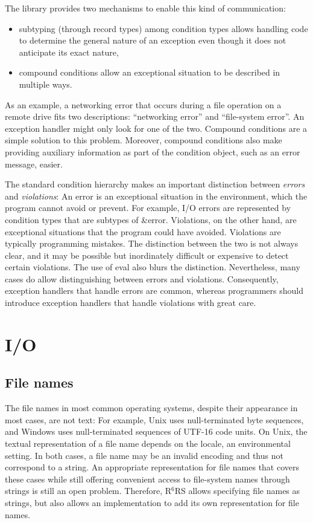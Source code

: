 \documentclass[twoside,twocolumn]{algol60}
\newcommand{\rn}[1]{R$^{#1}$RS}
\begin{document}
The  library provides two mechanisms to
enable this kind of communication:
%
\begin{itemize}
\item subtyping (through record types) among condition types allows
  handling code to determine the general nature of an exception even
  though it does not anticipate its exact nature,
\item compound conditions allow an exceptional situation to be
  described in multiple ways.
\end{itemize}
%
As an example, a networking error that occurs during a file operation
on a remote drive fits two descriptions: ``networking error'' and
``file-system error''.  An exception handler might only look for one of
the two.  Compound conditions are a simple solution to this problem.
Moreover, compound conditions also make providing auxiliary
information as part of the condition object, such as an error message,
easier.

The standard condition hierarchy makes an important distinction
between \emph{errors} and \emph{violations}: An error is an
exceptional situation in the environment, which the program cannot
avoid or prevent.  For example, I/O errors are represented by
condition types that are subtypes of {\cf\&error}.  Violations, on the
other hand, are exceptional situations that the program could have
avoided.  Violations are typically programming mistakes.  The
distinction between the two is not always clear, and it may be possible
but inordinately difficult or expensive to detect certain violations.
The use of {\cf eval} also blurs the distinction.  Nevertheless, many
cases do allow distinguishing between errors and violations.
Consequently, exception handlers that handle errors are common,
whereas programmers should introduce exception handlers that handle
violations with great care.


\chapter{I/O}

\section{File names}
\label{filenamesection}

The file names in most common operating systems, despite their
appearance in most cases, are not text: For example, Unix uses
null-terminated byte sequences, and Windows uses null-terminated
sequences of UTF-16 code units.  On Unix, the textual representation
of a file name depends on the locale, an environmental setting.  In both
cases, a file name may be an invalid encoding and thus not correspond
to a string.  An appropriate representation for file names that covers
these cases while still offering convenient access to file-system
names through strings is still an open problem.  Therefore,
\rn{6} allows specifying file names as strings, but also allows an
implementation to add its own representation for file names.
\end{document}
